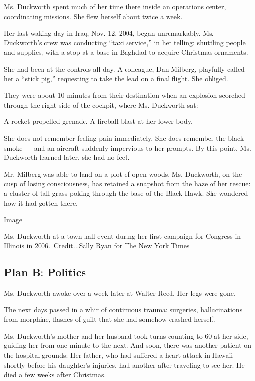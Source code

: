 Ms. Duckworth spent much of her time there inside an operations center,
coordinating missions. She flew herself about twice a week.

Her last waking day in Iraq, Nov. 12, 2004, began unremarkably. Ms.
Duckworth's crew was conducting ``taxi service,'' in her telling:
shuttling people and supplies, with a stop at a base in Baghdad to
acquire Christmas ornaments.

She had been at the controls all day. A colleague, Dan Milberg,
playfully called her a ``stick pig,'' requesting to take the lead on a
final flight. She obliged.

They were about 10 minutes from their destination when an explosion
scorched through the right side of the cockpit, where Ms. Duckworth sat:

A rocket-propelled grenade. A fireball blast at her lower body.

She does not remember feeling pain immediately. She does remember the
black smoke --- and an aircraft suddenly impervious to her prompts. By
this point, Ms. Duckworth learned later, she had no feet.

Mr. Milberg was able to land on a plot of open woods. Ms. Duckworth, on
the cusp of losing consciousness, has retained a snapshot from the haze
of her rescue: a cluster of tall grass poking through the base of the
Black Hawk. She wondered how it had gotten there.

Image

Ms. Duckworth at a town hall event during her first campaign for
Congress in Illinois in 2006.~Credit...Sally Ryan for The New York Times

\hypertarget{plan-b-politics}{%
\subsection{Plan B: Politics}\label{plan-b-politics}}

Ms. Duckworth awoke over a week later at Walter Reed. Her legs were
gone.

The next days passed in a whir of continuous trauma: surgeries,
hallucinations from morphine, flashes of guilt that she had somehow
crashed herself.

Ms. Duckworth's mother and her husband took turns counting to 60 at her
side, guiding her from one minute to the next. And soon, there was
another patient on the hospital grounds: Her father, who had suffered a
heart attack in Hawaii shortly before his daughter's injuries, had
another after traveling to see her. He died a few weeks after Christmas.

